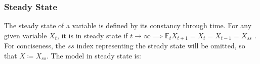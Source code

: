 \documentclass[../thesis.tex]{subfiles}
\begin{document}
\newpage


\subsubsection{Steady State}\label{sec:ext-mod-ss}

The steady state of a variable is defined by its constancy through time. For any given variable $X_t$, it is in steady state if $t \to \infty \implies \mathbb{E}_t X_{t+1} = X_t = X_{t-1} = X_{ss}$ \cite[p.41]{costa_junior_understanding_2016}. For conciseness, the $ss$ index representing the steady state will be omitted, so that $X \coloneq X_{ss}$. The model in steady state is:
\end{document}
